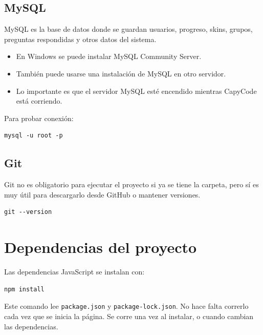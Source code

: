 \documentclass[12pt,letterpaper]{article}
\begin{document}
\subsection{MySQL}

MySQL es la base de datos donde se guardan usuarios, progreso, skins, grupos, preguntas respondidas y otros datos del sistema.

\begin{itemize}
  \item En Windows se puede instalar MySQL Community Server.
  \item También puede usarse una instalación de MySQL en otro servidor.
  \item Lo importante es que el servidor MySQL esté encendido mientras CapyCode está corriendo.
\end{itemize}

Para probar conexión:

\begin{lstlisting}[style=comandos]
mysql -u root -p
\end{lstlisting}

\subsection{Git}

Git no es obligatorio para ejecutar el proyecto si ya se tiene la carpeta, pero sí es muy útil para descargarlo desde GitHub o mantener versiones.

\begin{lstlisting}[style=comandos]
git --version
\end{lstlisting}

\section{Dependencias del proyecto}

Las dependencias JavaScript se instalan con:

\begin{lstlisting}[style=comandos]
npm install
\end{lstlisting}

Este comando lee \texttt{package.json} y \texttt{package-lock.json}. No hace falta correrlo cada vez que se inicia la página. Se corre una vez al instalar, o cuando cambian las dependencias.
\end{document}
